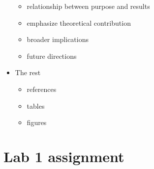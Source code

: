 \documentclass[11pt]{article}
\begin{document}
\begin{itemize}
\begin{itemize}
\item relationship between purpose and results
\item emphasize theoretical contribution
\item broader implications
\item future directions
\end{itemize}
\item The rest
\begin{itemize}
\item references
\item tables
\item figures
\end{itemize}
\end{itemize}

\section*{Lab 1 assignment}
\label{sec-3}
\end{document}
